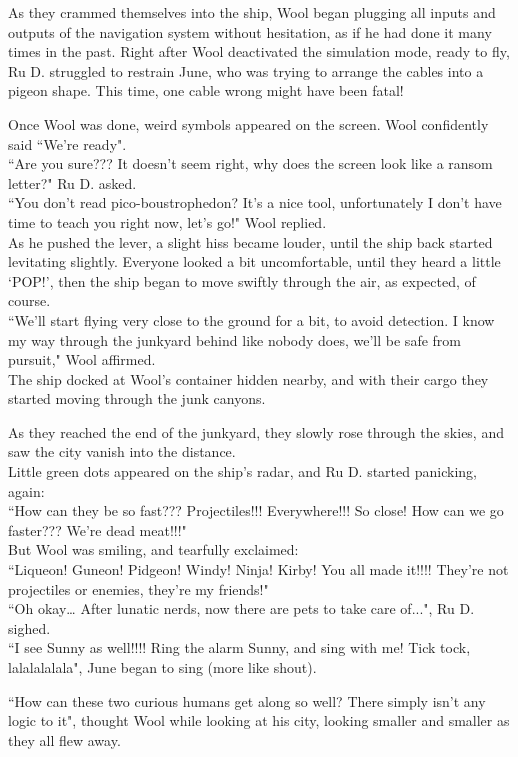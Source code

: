 As they crammed themselves into the ship, Wool began plugging all inputs and outputs of the navigation system without hesitation, as if he had done it many times in the past.
Right after Wool deactivated the simulation mode, ready to fly, Ru D. struggled to restrain June, who was trying to arrange the cables into a pigeon shape. This time, one cable wrong might have been fatal! 

Once Wool was done, weird symbols appeared on the screen. Wool confidently said ``We're ready".\\
``Are you sure??? It doesn't seem right, why does the screen look like a ransom letter?" Ru D. asked.\\
``You don't read pico-boustrophedon? It's a nice tool, unfortunately I don't have time to teach you right now, let's go!" Wool replied.\\
As he pushed the lever, a slight hiss became louder, until the ship back started levitating slightly. Everyone looked a bit uncomfortable, until they heard a little `POP!', then the ship began to move swiftly through the air, as expected, of course.\\
``We'll start flying very close to the ground for a bit, to avoid detection. I know my way through the junkyard behind like nobody does, we'll be safe from pursuit," Wool affirmed.\\
The ship docked at Wool's container hidden nearby, and with their cargo they started moving through the junk canyons.

As they reached the end of the junkyard, they slowly rose through the skies, and saw the city vanish into the distance.\\
Little green dots appeared on the ship's radar, and Ru D. started panicking, again:\\
``How can they be so fast??? Projectiles!!! Everywhere!!! So close! How can we go faster??? We’re dead meat!!!"\\
But Wool was smiling, and tearfully exclaimed:\\
``Liqueon! Guneon! Pidgeon! Windy! Ninja! Kirby! You all made it!!!! They’re not projectiles or enemies, they’re my friends!" \\
``Oh okay… After lunatic nerds, now there are pets to take care of...", Ru D. sighed.\\
``I see Sunny as well!!!! Ring the alarm Sunny, and sing with me! Tick tock, lalalalalala", June began to sing (more like shout).


``How can these two curious humans get along so well? There simply isn't any logic to it", thought Wool while looking at his city, looking smaller and smaller as they all flew away.